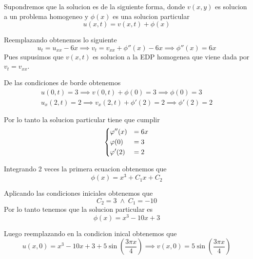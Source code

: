 \message{ !name(MAT024.tex)}\documentclass[../main.tex]{subfiles}
\begin{document}
\begin{solution}
  Supondremos que la solucion es de la siguiente forma, donde $v(x, y)$ es solucion a un problema
  homogeneo y $\phi(x)$ es una solucion particular
  \begin{equation*}
  u(x, t) = v(x, t) + \phi(x)
  \end{equation*}

  Reemplazando obtenemos lo siguiente
  \begin{equation*}
    u_{t} = u_{xx} - 6x \implies v_{t} = v_{xx} + \phi''(x) - 6x \implies \phi''(x) = 6x
  \end{equation*}
  Pues supusimos que $v(x, t)$ es solucion a la EDP homogenea que viene dada por $v_{t} = v_{xx}$.

  De las condiciones de borde obtenemos
  \begin{gather*}
    u(0, t) = 3 \implies v(0, t) + \phi(0) = 3 \implies \phi(0) = 3\\
    u_{x}(2, t) = 2 \implies v_{x}(2, t) + \phi'(2) = 2 \implies \phi'(2) = 2
  \end{gather*}

  Por lo tanto la solucion particular tiene que cumplir
  \begin{equation*}
    \begin{dcases}
      \phi''(x) &= 6x\\
      \phi(0) &= 3\\
      \phi'(2) &= 2
    \end{dcases}
  \end{equation*}

  Integrando 2 veces la primera ecuacion obtenemos que
  \begin{equation*}
    \phi(x) = x^{3} + C_{1}x + C_{2}
  \end{equation*}

  Aplicando las condiciones iniciales obtenemos que
  \begin{equation*}
    C_{2} = 3 \; \land \; C_{1} = -10
  \end{equation*}
  Por lo tanto tenemos que la solucion particular es
  \begin{equation*}
    \phi(x) = x^{3} - 10x + 3
  \end{equation*}

  Luego reemplazando en la condicion inical obtenemos que
  \begin{equation*}
    u(x, 0) = x^{3} -10x + 3 + 5\sin(\frac{3\pi x}{4}) \implies v(x, 0) = 5 \sin(\frac{3 \pi x}{4})
  \end{equation*}


\end{solution}
\end{document}
